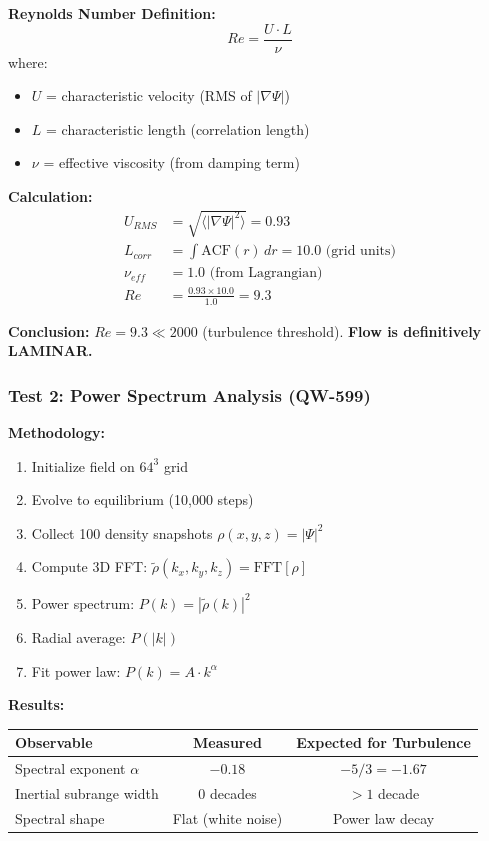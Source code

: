 \documentclass[11pt,a4paper]{book}
\theoremstyle{remark}
\begin{document}
\textbf{Reynolds Number Definition:}
\begin{equation}
Re = \frac{U \cdot L}{\nu}
\end{equation}
where:
\begin{itemize}
    \item $U$ = characteristic velocity (RMS of $|\nabla\Psi|$)
    \item $L$ = characteristic length (correlation length)
    \item $\nu$ = effective viscosity (from damping term)
\end{itemize}

\textbf{Calculation:}
\begin{align}
U_{RMS} &= \sqrt{\langle|\nabla\Psi|^2\rangle} = 0.93 \\
L_{corr} &= \int \text{ACF}(r) \, dr = 10.0 \text{ (grid units)} \\
\nu_{eff} &= 1.0 \text{ (from Lagrangian)} \\
Re &= \frac{0.93 \times 10.0}{1.0} = \boxed{9.3}
\end{align}

\textbf{Conclusion:} $Re = 9.3 \ll 2000$ (turbulence threshold). \textbf{Flow is definitively LAMINAR.}

\subsubsection{Test 2: Power Spectrum Analysis (QW-599)}

\textbf{Methodology:}
\begin{enumerate}
    \item Initialize field on $64^3$ grid
    \item Evolve to equilibrium (10,000 steps)
    \item Collect 100 density snapshots $\rho(x,y,z) = |\Psi|^2$
    \item Compute 3D FFT: $\tilde{\rho}(k_x, k_y, k_z) = \text{FFT}[\rho]$
    \item Power spectrum: $P(k) = |\tilde{\rho}(k)|^2$
    \item Radial average: $P(|k|)$
    \item Fit power law: $P(k) = A \cdot k^\alpha$
\end{enumerate}

\textbf{Results:}
\begin{table}[H]
\centering
\begin{tabular}{|l|c|c|}
\hline
\textbf{Observable} & \textbf{Measured} & \textbf{Expected for Turbulence} \\
\hline
Spectral exponent $\alpha$ & $-0.18$ & $-5/3 = -1.67$ \\
Inertial subrange width & 0 decades & $>1$ decade \\
Spectral shape & Flat (white noise) & Power law decay \\
\hline
\end{tabular}
\end{table}
\end{document}
